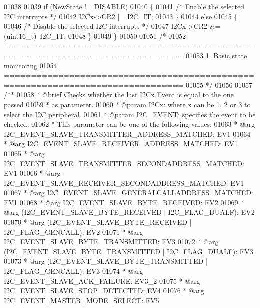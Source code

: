 \begin{DoxyCode}
01038 
01039   \textcolor{keywordflow}{if} (NewState != DISABLE)
01040   \{
01041     \textcolor{comment}{/* Enable the selected I2C interrupts */}
01042     I2Cx->CR2 |= I2C\_IT;
01043   \}
01044   \textcolor{keywordflow}{else}
01045   \{
01046     \textcolor{comment}{/* Disable the selected I2C interrupts */}
01047     I2Cx->CR2 &= (uint16\_t)~I2C\_IT;
01048   \}
01049 \}
01050 
01051 \textcolor{comment}{/*}
01052 \textcolor{comment}{ ===============================================================================}
01053 \textcolor{comment}{                          1. Basic state monitoring                    }
01054 \textcolor{comment}{ ===============================================================================  }
01055 \textcolor{comment}{ */}
01056 
01057 \textcolor{comment}{/**}
01058 \textcolor{comment}{  * @brief  Checks whether the last I2Cx Event is equal to the one passed}
01059 \textcolor{comment}{  *         as parameter.}
01060 \textcolor{comment}{  * @param  I2Cx: where x can be 1, 2 or 3 to select the I2C peripheral.}
01061 \textcolor{comment}{  * @param  I2C\_EVENT: specifies the event to be checked. }
01062 \textcolor{comment}{  *          This parameter can be one of the following values:}
01063 \textcolor{comment}{  *            @arg I2C\_EVENT\_SLAVE\_TRANSMITTER\_ADDRESS\_MATCHED: EV1}
01064 \textcolor{comment}{  *            @arg I2C\_EVENT\_SLAVE\_RECEIVER\_ADDRESS\_MATCHED: EV1}
01065 \textcolor{comment}{  *            @arg I2C\_EVENT\_SLAVE\_TRANSMITTER\_SECONDADDRESS\_MATCHED: EV1}
01066 \textcolor{comment}{  *            @arg I2C\_EVENT\_SLAVE\_RECEIVER\_SECONDADDRESS\_MATCHED: EV1}
01067 \textcolor{comment}{  *            @arg I2C\_EVENT\_SLAVE\_GENERALCALLADDRESS\_MATCHED: EV1}
01068 \textcolor{comment}{  *            @arg I2C\_EVENT\_SLAVE\_BYTE\_RECEIVED: EV2}
01069 \textcolor{comment}{  *            @arg (I2C\_EVENT\_SLAVE\_BYTE\_RECEIVED | I2C\_FLAG\_DUALF): EV2}
01070 \textcolor{comment}{  *            @arg (I2C\_EVENT\_SLAVE\_BYTE\_RECEIVED | I2C\_FLAG\_GENCALL): EV2}
01071 \textcolor{comment}{  *            @arg I2C\_EVENT\_SLAVE\_BYTE\_TRANSMITTED: EV3}
01072 \textcolor{comment}{  *            @arg (I2C\_EVENT\_SLAVE\_BYTE\_TRANSMITTED | I2C\_FLAG\_DUALF): EV3}
01073 \textcolor{comment}{  *            @arg (I2C\_EVENT\_SLAVE\_BYTE\_TRANSMITTED | I2C\_FLAG\_GENCALL): EV3}
01074 \textcolor{comment}{  *            @arg I2C\_EVENT\_SLAVE\_ACK\_FAILURE: EV3\_2}
01075 \textcolor{comment}{  *            @arg I2C\_EVENT\_SLAVE\_STOP\_DETECTED: EV4}
01076 \textcolor{comment}{  *            @arg I2C\_EVENT\_MASTER\_MODE\_SELECT: EV5}

\end{DoxyCode}
